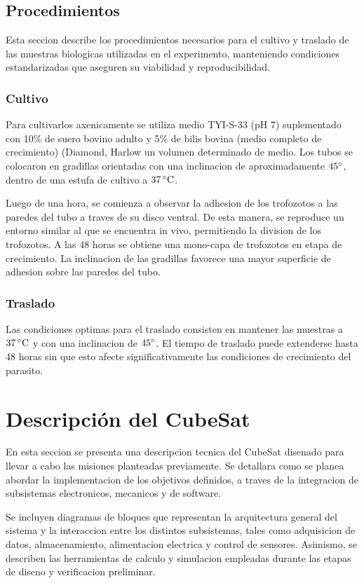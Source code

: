   \subsection{Procedimientos}
    Esta seccion describe los procedimientos necesarios para el cultivo y traslado de las muestras
    biologicas utilizadas en el experimento, manteniendo condiciones estandarizadas que
    aseguren su viabilidad y reproducibilidad.

    \subsubsection{Cultivo}
    Para cultivarlos axenicamente se utiliza medio TYI-S-33 (pH 7) suplementado con 10\% de
    suero bovino adulto y 5\% de bilis bovina (medio completo de crecimiento) (Diamond, Harlow
    un volumen determinado de medio. Los tubos se colocaron en gradillas orientadas con una
    inclinacion de aproximadamente $45^{\circ}$, dentro de una estufa de cultivo a $37 \,^\circ\mathrm{C}$.

    Luego de una hora, se comienza a observar la adhesion de los trofozotos a las paredes del
    tubo a traves de su disco ventral. De esta manera, se reproduce un entorno similar al que se
    encuentra in vivo, permitiendo la division de los trofozotos. A las 48 horas se obtiene una
    mono-capa de trofozotos en etapa de crecimiento. La inclinacion de las gradillas favorece
    una mayor superficie de adhesion sobre las paredes del tubo.

    \subsubsection{Traslado}
    Las condiciones optimas para el traslado consisten en mantener las muestras a $37\,^\circ\mathrm{C}$ y con
    una inclinacion de $45^{\circ}$. El tiempo de traslado puede extenderse hasta 48 horas sin que esto
    afecte significativamente las condiciones de crecimiento del parasito.

\section{Descripción del CubeSat}
En esta seccion se presenta una descripcion tecnica del CubeSat disenado para llevar a
cabo las misiones planteadas previamente. Se detallara como se planea abordar la implementacion de
los objetivos definidos, a traves de la integracion de subsistemas electronicos, mecanicos y de software.

Se incluyen diagramas de bloques que representan la arquitectura general del sistema y la
interaccion entre los distintos subsistemas, tales como adquisicion de datos, almacenamiento,
alimentacion electrica y control de sensores. Asimismo, se describen las herramientas de
calculo y simulacion empleadas durante las etapas de diseno y verificacion preliminar.

